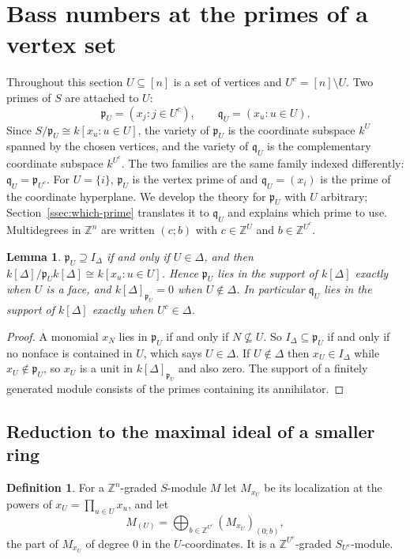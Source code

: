 \documentclass[11pt]{article}
\theoremstyle{plain}
\newtheorem{lemma}[theorem]{Lemma}
\theoremstyle{definition}
\newtheorem{definition}[theorem]{Definition}
\newcommand{\kk}{k}
\newcommand{\ZZ}{\mathbb{Z}}
\newcommand{\pp}{\mathfrak{p}}
\begin{document}
\section{Bass numbers at the primes of a vertex set}\label{sec:bass-static}

Throughout this section $U\subseteq[n]$ is a set of vertices and $U^c=[n]\setminus U$. Two primes of $S$ are
attached to $U$:
\[
\pp_U=(x_j:j\in U^c),\qquad \mathfrak q_U=(x_u:u\in U).
\]
Since $S/\pp_U\cong\kk[x_u:u\in U]$, the variety of $\pp_U$ is the coordinate subspace $\kk^U$ spanned by the
chosen vertices, and the variety of $\mathfrak q_U$ is the complementary coordinate subspace $\kk^{U^c}$. The two
families are the same family indexed differently: $\mathfrak q_U=\pp_{U^c}$. For $U=\{i\}$, $\pp_U$ is the vertex
prime of \cite{HeSuwayyidWei} and $\mathfrak q_U=(x_i)$ is the prime of the coordinate hyperplane. We develop the
theory for $\pp_U$ with $U$ arbitrary; Section~\ref{ssec:which-prime} translates it to $\mathfrak q_U$ and explains
which prime to use. Multidegrees in $\ZZ^n$ are written $(c;b)$ with $c\in\ZZ^U$ and $b\in\ZZ^{U^c}$.

\begin{lemma}\label{lem:support}
$\pp_U\supseteq I_\Delta$ if and only if $U\in\Delta$, and then $\kk[\Delta]/\pp_U\kk[\Delta]\cong\kk[x_u:u\in U]$.
Hence $\pp_U$ lies in the support of $\kk[\Delta]$ exactly when $U$ is a face, and $\kk[\Delta]_{\pp_U}=0$ when
$U\notin\Delta$. In particular $\mathfrak q_U$ lies in the support of $\kk[\Delta]$ exactly when $U^c\in\Delta$.
\end{lemma}

\begin{proof}
A monomial $x_N$ lies in $\pp_U$ if and only if $N\not\subseteq U$. So $I_\Delta\subseteq\pp_U$ if and only if no
nonface is contained in $U$, which says $U\in\Delta$. If $U\notin\Delta$ then $x_U\in I_\Delta$ while
$x_U\notin\pp_U$, so $x_U$ is a unit in $\kk[\Delta]_{\pp_U}$ and also zero. The support of a finitely generated
module consists of the primes containing its annihilator.
\end{proof}

\subsection{Reduction to the maximal ideal of a smaller ring}

\begin{definition}
For a $\ZZ^n$-graded $S$-module $M$ let $M_{x_U}$ be its localization at the powers of $x_U=\prod_{u\in U}x_u$, and let
\[
M_{(U)}=\bigoplus_{b\in\ZZ^{U^c}}(M_{x_U})_{(0;b)},
\]
the part of $M_{x_U}$ of degree $0$ in the $U$-coordinates. It is a $\ZZ^{U^c}$-graded $S_{U^c}$-module.
\end{definition}
\end{document}

